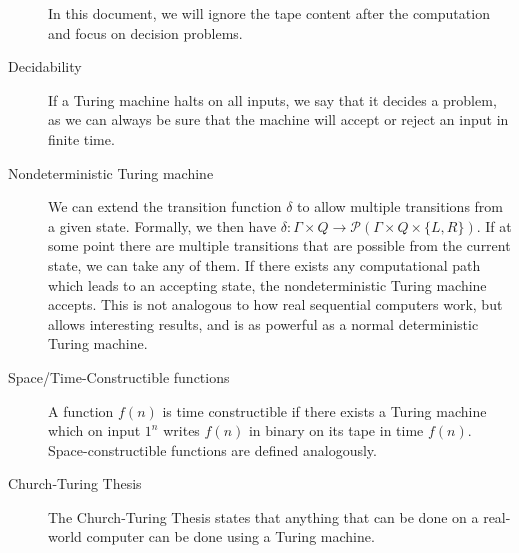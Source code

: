 \begin{description}
    In this document, we will ignore the tape content after the computation and focus on decision problems.
    \item[Decidability] If a Turing machine halts on all inputs, we say that it decides a problem, as we can always be sure that the machine will accept or reject an input in finite time.
    \item[Nondeterministic Turing machine] We can extend the transition function $\delta$ to allow multiple transitions from a given state.
    Formally, we then have $\delta : \Gamma \times Q \to \mathcal{P}(\Gamma \times Q \times \{L, R\})$.
    If at some point there are multiple transitions that are possible from the current state, we can take any of them.
    If there exists any computational path which leads to an accepting state, the nondeterministic Turing machine accepts.
    This is not analogous to how real sequential computers work, but allows interesting results, and is as powerful as a normal deterministic Turing machine.
    \item[Space/Time-Constructible functions] A function $f(n)$ is time constructible if there exists a Turing machine which on input $1^{n}$ writes $f(n)$ in binary on its tape in time $f(n)$.
    Space-constructible functions are defined analogously.
    \item[Church-Turing Thesis] The Church-Turing Thesis states that anything that can be done on a real-world computer can be done using a Turing machine.
\end{description}

